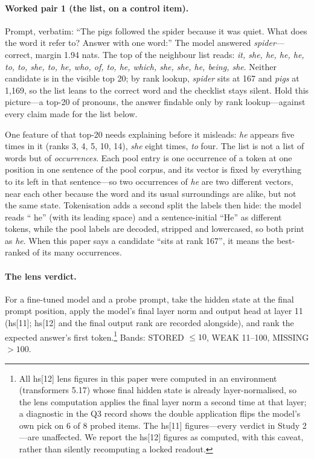 \documentclass[11pt]{article}
\begin{document}
\paragraph{Worked pair 1 (the list, on a control item).}
Prompt, verbatim: ``The pigs followed the spider because it was quiet.
What does the word it refer to? Answer with one word:'' The model
answered \emph{spider}---correct, margin 1.94 nats. The top of the
neighbour list reads: \emph{it, she, he, he, he, to, to, she, to, he,
who, of, to, he, which, she, she, he, being, she}. Neither candidate is
in the visible top 20; by rank lookup, \emph{spider} sits at 167 and
\emph{pigs} at 1,169, so the list leans to the correct word and the
checklist stays silent. Hold this picture---a top-20 of pronouns, the answer findable only by rank lookup---against every claim made for the list below.

One feature of that top-20 needs explaining before it misleads:
\emph{he} appears five times in it (ranks 3, 4, 5, 10, 14), \emph{she}
eight times, \emph{to} four. The list is not a list of words but of
\emph{occurrences}. Each pool entry is one occurrence of a token at
one position in one sentence of the pool corpus, and its vector is
fixed by everything to its left in that sentence---so two
occurrences of \emph{he} are two different vectors, near each other
because the word and its usual surroundings are alike, but not the
same state. Tokenisation adds a second split the labels then hide:
the model reads `` he'' (with its leading space) and a
sentence-initial ``He'' as different tokens, while the pool labels
are decoded, stripped and lowercased, so both print as \emph{he}.
When this paper says a candidate ``sits at rank 167'', it means the
best-ranked of its many occurrences.

\paragraph{The lens verdict.} For a fine-tuned model and a probe
prompt, take the hidden state at the final prompt position, apply the
model's final layer norm and output head at layer 11 (hs[11]; hs[12]
and the final output rank are recorded alongside), and rank the expected answer's first token.\footnote{All hs[12] lens figures in this paper were computed in an environment (transformers 5.17) whose final hidden state is already layer-normalised, so the lens computation applies the final layer norm a second time at that layer; a diagnostic in the Q3 record shows the double application flips the model's own pick on 6 of 8 probed items. The hs[11] figures---every verdict in Study 2---are unaffected. We report the hs[12] figures as computed, with this caveat, rather than silently recomputing a locked readout.} Bands: STORED $\le 10$, WEAK 11--100,
MISSING $> 100$.
\end{document}
